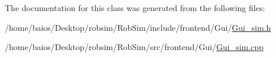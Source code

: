 The documentation for this class was generated from the following files\-:\begin{DoxyCompactItemize}
\item 
/home/baios/\-Desktop/robsim/\-Rob\-Sim/include/frontend/\-Gui/\hyperlink{_gui__sim_8h}{Gui\-\_\-sim.\-h}\item 
/home/baios/\-Desktop/robsim/\-Rob\-Sim/src/frontend/\-Gui/\hyperlink{_gui__sim_8cpp}{Gui\-\_\-sim.\-cpp}\end{DoxyCompactItemize}
